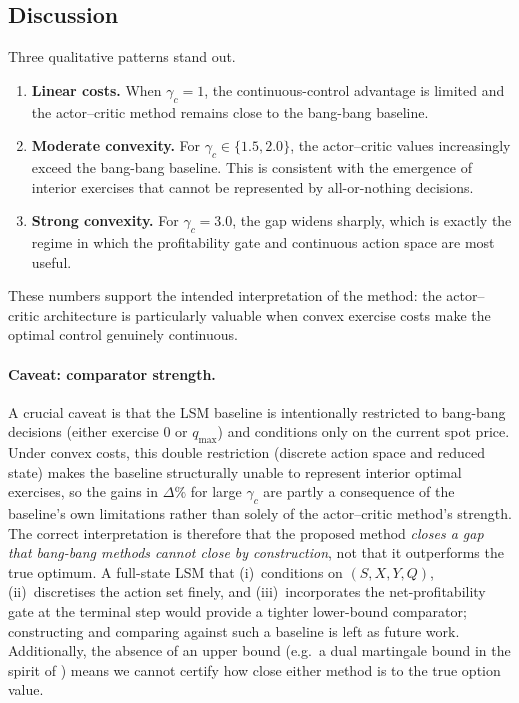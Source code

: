 \documentclass[a4paper,fleqn]{cas-dc}
\begin{document}
\subsection{Discussion}

Three qualitative patterns stand out.
\begin{enumerate}
    \item \textbf{Linear costs.} When $\gamma_c = 1$, the continuous-control advantage is limited and the actor--critic method remains close to the bang-bang baseline.
    \item \textbf{Moderate convexity.} For $\gamma_c \in \{1.5,2.0\}$, the actor--critic values increasingly exceed the bang-bang baseline. This is consistent with the emergence of interior exercises that cannot be represented by all-or-nothing decisions.
    \item \textbf{Strong convexity.} For $\gamma_c = 3.0$, the gap widens sharply, which is exactly the regime in which the profitability gate and continuous action space are most useful.
\end{enumerate}

These numbers support the intended interpretation of the method: the actor--critic architecture is particularly valuable when convex exercise costs make the optimal control genuinely continuous.

\paragraph{Caveat: comparator strength.}
A crucial caveat is that the LSM baseline is intentionally restricted to bang-bang decisions (either exercise $0$ or $q_{\max}$) and conditions only on the current spot price.
Under convex costs, this double restriction (discrete action space and reduced state) makes the baseline structurally unable to represent interior optimal exercises, so the gains in $\Delta\%$ for large $\gamma_c$ are partly a consequence of the baseline's own limitations rather than solely of the actor--critic method's strength.
The correct interpretation is therefore that the proposed method \emph{closes a gap that bang-bang methods cannot close by construction}, not that it outperforms the true optimum.
A full-state LSM that (i)~conditions on $(S, X, Y, Q)$, (ii)~discretises the action set finely, and (iii)~incorporates the net-profitability gate at the terminal step would provide a tighter lower-bound comparator; constructing and comparing against such a baseline is left as future work.
Additionally, the absence of an upper bound (e.g.\ a dual martingale bound in the spirit of \citealt{andersen2004primal}) means we cannot certify how close either method is to the true option value.
\end{document}
